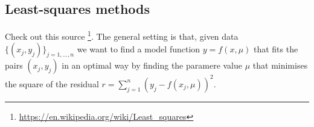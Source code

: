\documentclass[../main.tex]{subfiles}
\begin{document}
\subsection{Least-squares methods}\label{sec1}
Check out this source \footnote{\url{https://en.wikipedia.org/wiki/Least_squares}}.
The general setting is that, given data $\{(x_{j},y_{j})\}_{j=1,\dots,n}$ we want to find a model function $y=f(x,\mu)$ that fits the pairs $(x_{j},y_{j})$ in an optimal way by finding the paramere value $\mu$ that minimises the square of the residual $r = \sum_{j=1}^{n}(y_{j}-f(x_{j},\mu))^2$.

\end{document}
